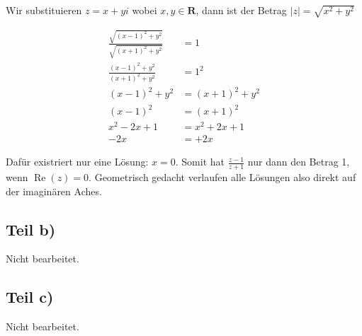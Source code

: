 \documentclass[a4paper,german,12pt]{article}
\begin{document}
Wir substituieren $z = x+yi$ wobei $x,y \in \mathbf{R}$, dann ist der Betrag
$|z| = \sqrt{x^2+y^2}$

\begin{align}
\frac{\sqrt{(x-1)^2+y^2}}{\sqrt{(x+1)^2+y^2}} &= 1 \\
\frac{(x-1)^2+y^2}{(x+1)^2+y^2} &= 1^2 \\
(x-1)^2+y^2 &= (x+1)^2+y^2 \\
(x-1)^2 &= (x+1)^2 \\
x^2-2x+1 &= x^2+2x+1 \\
-2x &= +2x
\end{align}

Dafür existriert nur eine Lösung: $x = 0$. Somit hat $\frac{z-1}{z+1}$ nur dann den
Betrag 1, wenn $\operatorname{Re}(z) = 0$. Geometrisch gedacht verlaufen
alle Lösungen also direkt auf der imaginären Aches.

\subsection*{Teil b)}

Nicht bearbeitet.

\subsection*{Teil c)}

Nicht bearbeitet.
\end{document}
